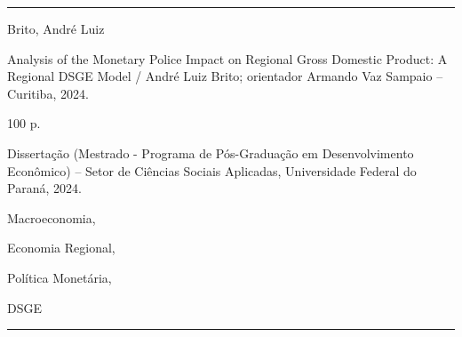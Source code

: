 \documentclass[../thesis.tex]{subfiles}
\begin{document}
	\newpage
	
	\null
	\vfill
	\hrule
	\vspace*{-0.3cm}
	
	{\singlespacing
		
	Brito, André Luiz

	\hspace{0.5cm} Analysis of the Monetary Police Impact on Regional Gross Domestic Product: A Regional DSGE Model / André Luiz Brito; orientador Armando Vaz Sampaio -- Curitiba, 2024.
	
	\hspace{0.5cm} 100 p.
	
	\hspace{0.5cm} Dissertação (Mestrado - Programa de Pós-Graduação em Desenvolvimento Econômico) -- Setor de Ciências Sociais Aplicadas, Universidade Federal do Paraná, 2024.
	
	\hspace{0.5cm} 
	\begin{enumerate*}[label=\arabic*.]
		\item Macroeconomia, 
		\item Economia Regional, 
		\item Política Monetária,
		\item DSGE
	\end{enumerate*}		
	
	}	
		
	\vspace*{0.5cm}
	
	\hrule
	
	\vspace*{1cm}
	
	\thispagestyle{empty}
	
\end{document}
